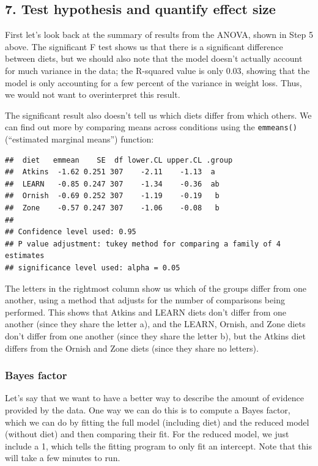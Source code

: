 \documentclass[12pt,]{book}
\theoremstyle{definition}
\theoremstyle{definition}
\theoremstyle{definition}
\theoremstyle{remark}
\begin{document}
\hypertarget{test-hypothesis-and-quantify-effect-size}{%
\subsection{7. Test hypothesis and quantify effect size}\label{test-hypothesis-and-quantify-effect-size}}

First let's look back at the summary of results from the ANOVA, shown in Step 5 above. The significant F test shows us that there is a significant difference between diets, but we should also note that the model doesn't actually account for much variance in the data; the R-squared value is only 0.03, showing that the model is only accounting for a few percent of the variance in weight loss. Thus, we would not want to overinterpret this result.

The significant result also doesn't tell us which diets differ from which others. We can find out more by comparing means across conditions using the \texttt{emmeans()} (``estimated marginal means'') function:

\begin{verbatim}
##  diet   emmean    SE  df lower.CL upper.CL .group
##  Atkins  -1.62 0.251 307    -2.11    -1.13  a    
##  LEARN   -0.85 0.247 307    -1.34    -0.36  ab   
##  Ornish  -0.69 0.252 307    -1.19    -0.19   b   
##  Zone    -0.57 0.247 307    -1.06    -0.08   b   
## 
## Confidence level used: 0.95 
## P value adjustment: tukey method for comparing a family of 4 estimates 
## significance level used: alpha = 0.05
\end{verbatim}

The letters in the rightmost column show us which of the groups differ from one another, using a method that adjusts for the number of comparisons being performed. This shows that Atkins and LEARN diets don't differ from one another (since they share the letter a), and the LEARN, Ornish, and Zone diets don't differ from one another (since they share the letter b), but the Atkins diet differs from the Ornish and Zone diets (since they share no letters).

\hypertarget{bayes-factor-1}{%
\subsubsection{Bayes factor}\label{bayes-factor-1}}

Let's say that we want to have a better way to describe the amount of evidence provided by the data. One way we can do this is to compute a Bayes factor, which we can do by fitting the full model (including diet) and the reduced model (without diet) and then comparing their fit. For the reduced model, we just include a 1, which tells the fitting program to only fit an intercept. Note that this will take a few minutes to run.
\end{document}
